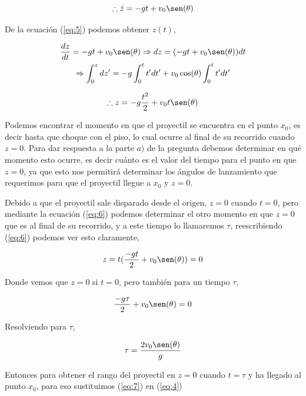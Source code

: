 \documentclass[a4paper,10pt]{article}
\begin{document}
\begin{equation}
 \therefore \dot{z} = -gt + v_0 \sen(\theta)
 \label{eq:5}
\end{equation}

De la ecuación (\ref{eq:5}) podemos obtener $z(t)$,

\begin{gather*}
 \frac{dz}{dt} = -gt + v_0 \sen(\theta) \Rightarrow dz = (-gt + v_0 \sen(\theta)) dt \\ \Rightarrow
 \int_0^z dz' = -g\int_0^t t' dt' + v_0 \cos(\theta) \int_0^t t'dt'
\end{gather*}

\begin{equation}
 \therefore z = - g \frac{t^2}{2} + v_0 t \sen(\theta)
 \label{eq:6}
\end{equation}

Podemos encontrar el momento en que el proyectil se encuentra en el punto $x_0$, 
es decir hasta que choque con el piso, lo cual ocurre al final de su recorrido cuando $z=0$.
Para dar respuesta a la parte $a)$ de la pregunta debemos determinar en qué momento
esto ocurre, es decir cuánto es el valor del tiempo para el punto en que 
$z=0$, ya que esto nos permitirá determinar los ángulos de lanzamiento
que requerimos para que el proyectil llegue a $x_0$ y $z=0$.

\vspace{.3cm}

Debido a que el proyectil sale disparado desde el origen, $z=0$ cuando
$t=0$, pero mediante la ecuación (\ref{eq:6}) podemos determinar el otro
momento en que $z=0$ que es al final de su recorrido, y a este tiempo
lo llamaremos $\tau$, reescribiendo (\ref{eq:6}) podemos ver esto claramente,

\begin{equation*}
 z = t(\frac{-gt}{2} + v_0 \sen(\theta)) = 0
\end{equation*}

Donde vemos que $z=0$ si $t=0$, pero también para un tiempo $\tau$,

\begin{equation*}
 \frac{-g\tau}{2} + v_0 \sen(\theta) = 0
\end{equation*}

Resolviendo para $\tau$,

\begin{equation}
 \tau = \frac{2v_0\sen(\theta)}{g}
 \label{eq:7}
\end{equation}

Entonces para obtener el rango del proyectil en $z=0$ cuando
$t=\tau$ y ha llegado al punto $x_0$, para eso sustituimos (\ref{eq:7}) en (\ref{eq:4})
\end{document}

